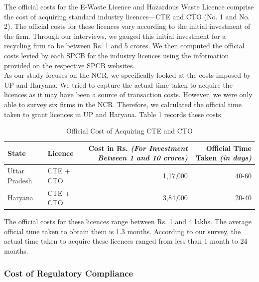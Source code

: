 \documentclass[a4paper, 12pt]{article}
\begin{document}
                    The official costs for the E-Waste Licence and Hazardous Waste Licence comprise the cost of acquiring standard industry licences—CTE and CTO (No. 1 and No. 2). The official costs for these licences vary according to the initial investment of the firm. Through our interviews, we gauged this initial investment for a recycling firm to be between Rs. 1 and 5 crores. We then computed the official costs levied by each SPCB for the industry licences using the information provided on the respective SPCB websites.\\ 
                    
                    As our study focuses on the NCR, we specifically looked at the costs imposed by UP and Haryana. We tried to capture the actual time taken to acquire the licences as it may have been a source of transaction costs. However, we were only able to survey six firms in the NCR. Therefore, we calculated the official time taken to grant licences in UP and Haryana. Table 1 records these costs. \\
          
\begin{table}[htpb]
\caption{Official Cost of Acquiring CTE and CTO}
\begin{tabular}{ l  l  r  r }
 \multicolumn{1}{p{7em}}{State} & \multicolumn{1}{p{7em}}{Licence} & \multicolumn{1}{p{11.5em}}{Cost in Rs. \footnotesize\textit{(For Investment Between 1 and 10 crores)}} & \multicolumn{1}{p{8.75em}}{{Official Time Taken} \raggedleft\footnotesize\textit{(in days)}}\\ 

\hline
Uttar Pradesh & CTE + CTO & 1,17,000 & 40-60\\ 
Haryana & CTE + CTO & 3,84,000 & 20-40\\

\end{tabular}
\end{table}
                    
                    The official costs for these licences range between Rs. 1 and 4 lakhs. The average official time taken to obtain them is 1.3 months. According to our survey, the actual time taken to acquire these licences ranged from less than 1 month to 24 months.
                    
                    \subsubsection{Cost of Regulatory Compliance}
                    
\end{document}
